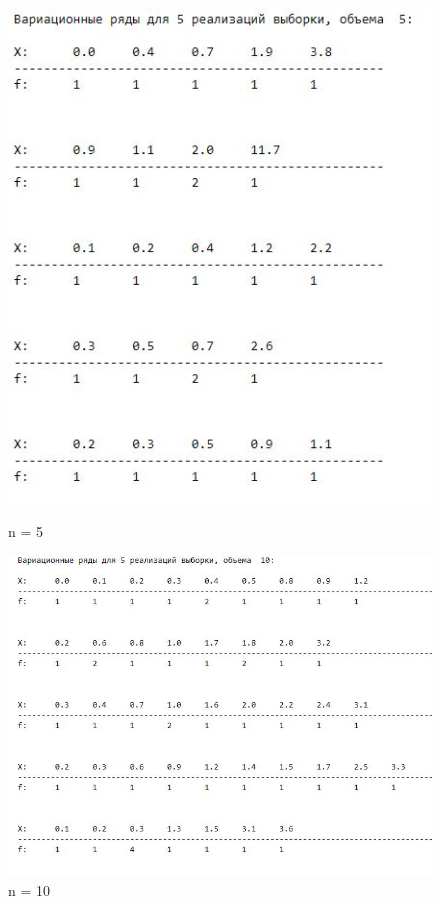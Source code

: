 \documentclass[a4paper,12pt, oneside]{book}
\begin{document}
\begin{figure}[h!]
	\begin{center}
		\begin{minipage}[h]{0.4\linewidth}
			\includegraphics[width=1\linewidth]{var_ser_exp_5.jpg}
			\caption{n = 5} %
		\end{minipage}
		\hfill	
		\begin{minipage}[h]{0.4\linewidth}
			\includegraphics[width=1\linewidth]{var_ser_exp_10.jpg}	
			\caption{n = 10} %
		\end{minipage}
		
	\end{center}
\end{figure}
\end{document}
